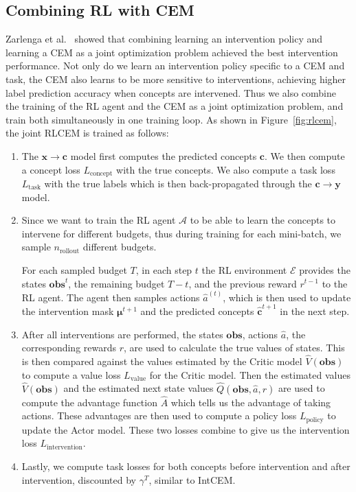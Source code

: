 \subsection{Combining RL with CEM}

Zarlenga et al.~\cite{intcem} showed that combining learning an intervention policy
and learning a CEM as a joint optimization problem achieved the best intervention performance.
Not only do we learn an intervention policy specific to a CEM and task, the 
CEM also learns to be more sensitive to interventions, achieving higher label prediction accuracy
when concepts are intervened. Thus we also combine the training of the RL agent and the CEM
as a joint optimization problem, and train
both simultaneously in one training loop.
As shown in Figure~\ref{fig:rlcem}, the joint RLCEM
is trained as follows:

\begin{enumerate}
    \item The $\mathbf{x} \to \mathbf{c}$ model first computes the predicted concepts $\mathbf{c}$.
    We then compute a concept loss $L_{\text{concept}}$ with the true concepts.
    We also compute a task loss $L_{\text{task}}$ with the true labels
    which is then 
    back-propagated through the $\mathbf{c} \to \mathbf{y}$ model.
    \item Since we want to train the RL agent $\mathcal{A}$ to be able to learn 
    the concepts to intervene for different budgets, thus during training 
    for each mini-batch, we sample $n_{\text{rollout}}$ different budgets.

    For each sampled budget $T$, 
    in each step $t$
    the RL environment $\mathcal{E}$ provides
    the states $\textbf{obs}^t$, the remaining budget $T - t$, 
    and the previous reward $r^{t-1}$ to the RL agent. The agent then samples actions
    $\hat{a}^{(t)}$, which is then used to update the intervention mask $\bm{\mu}^{t+1}$
    and the predicted concepts $\hat{\mathbf{c}}^{t+1}$ in the next step.

    \item After all interventions are performed, the states $\textbf{obs}$,
    actions $\hat{a}$,
    the corresponding rewards $r$, are used to calculate the true values of states.
    This is then compared against the values estimated by the Critic model
    $\hat{V}(\textbf{obs})$
    to compute a value loss $L_{\text{value}}$ for the Critic model.
    Then the estimated values $\hat{V}(\textbf{obs})$ and the estimated 
    next state values $\hat{Q}(\textbf{obs}, \hat{a}, r)$
    are used to compute the advantage function $\hat{A}$ which tells us
    the advantage of taking actions. These advantages are then used to compute
    a policy loss $L_{\text{policy}}$ to update the Actor model.
    These two losses combine to give us the intervention loss $L_{\text{intervention}}$.
    \item Lastly, we compute task losses for both concepts before intervention and after intervention,
    discounted by $\gamma^T$, similar to IntCEM.
\end{enumerate}

